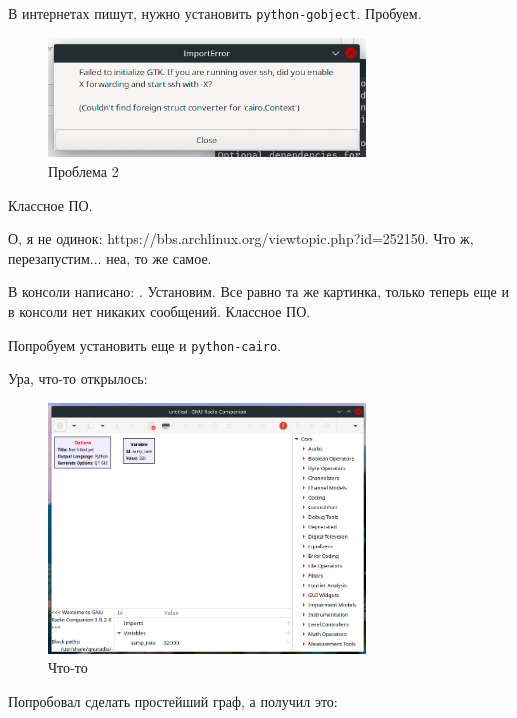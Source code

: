 \documentclass[a4paper,12pt]{report}
\begin{document}
    В интернетах пишут, нужно установить \texttt{python-gobject}. Пробуем.
    
    \begin{figure}[H]
        \centering
        \includegraphics[width=0.75\textwidth]{images/error_2.png}
        \caption{Проблема 2}
        \label{fig:error_2}
    \end{figure}
    
    Классное ПО.
    
    О, я не одинок: https://bbs.archlinux.org/viewtopic.php?id=252150. Что ж, перезапустим... неа, то же самое.
    
    В консоли написано: . Установим. Все равно та же картинка, только теперь еще и в консоли нет никаких сообщений. Классное ПО.
    
    Попробуем установить еще и \texttt{python-cairo}.
    
    Ура, что-то открылось:
    
    \begin{figure}[H]
        \centering
        \includegraphics[width=0.75\textwidth]{images/window.png}
        \caption{Что-то}
        \label{fig:window}
    \end{figure}
    
    Попробовал сделать простейший граф, а получил это:
    
\end{document}
